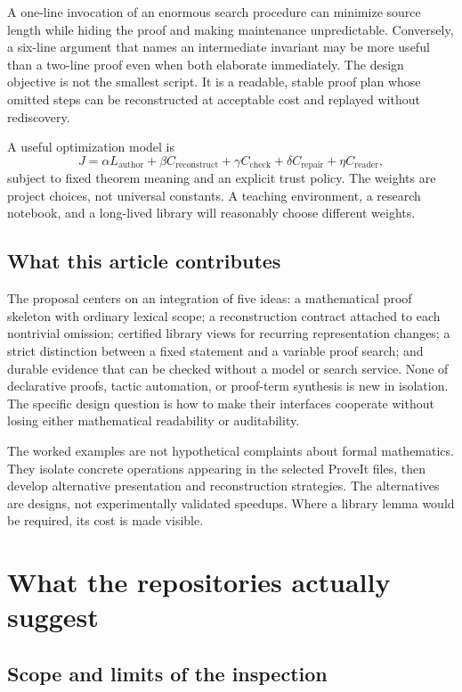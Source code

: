 \documentclass[11pt,a4paper]{article}
\theoremstyle{remark}
\begin{document}
A one-line invocation of an enormous search procedure can minimize source length while hiding the proof and making maintenance unpredictable. Conversely, a six-line argument that names an intermediate invariant may be more useful than a two-line proof even when both elaborate immediately. The design objective is not the smallest script. It is a readable, stable proof plan whose omitted steps can be reconstructed at acceptable cost and replayed without rediscovery.

A useful optimization model is
\[
 J=\alpha L_{\mathrm{author}}+\beta C_{\mathrm{reconstruct}}
   +\gamma C_{\mathrm{check}}+\delta C_{\mathrm{repair}}
   +\eta C_{\mathrm{reader}},
\]
subject to fixed theorem meaning and an explicit trust policy. The weights are project choices, not universal constants. A teaching environment, a research notebook, and a long-lived library will reasonably choose different weights.

\subsection{What this article contributes}

The proposal centers on an integration of five ideas: a mathematical proof skeleton with ordinary lexical scope; a reconstruction contract attached to each nontrivial omission; certified library views for recurring representation changes; a strict distinction between a fixed statement and a variable proof search; and durable evidence that can be checked without a model or search service. None of declarative proofs, tactic automation, or proof-term synthesis is new in isolation. The specific design question is how to make their interfaces cooperate without losing either mathematical readability or auditability.

The worked examples are not hypothetical complaints about formal mathematics. They isolate concrete operations appearing in the selected ProveIt files, then develop alternative presentation and reconstruction strategies. The alternatives are designs, not experimentally validated speedups. Where a library lemma would be required, its cost is made visible.

\section{What the repositories actually suggest}\label{sec:survey}

\subsection{Scope and limits of the inspection}
\end{document}
